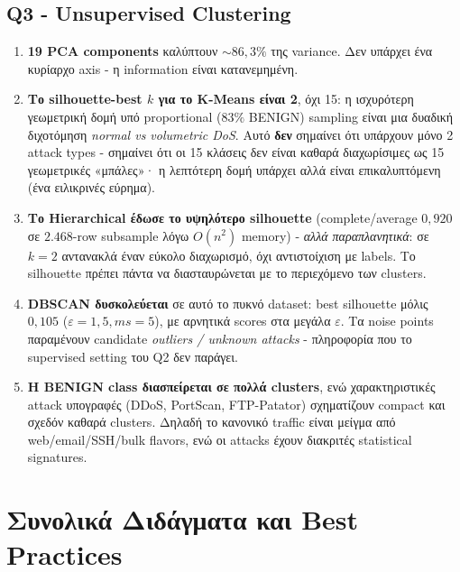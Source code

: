 \documentclass[12pt,a4paper,twoside]{book}
\begin{document}
\subsection{Q3 - Unsupervised Clustering}
\begin{enumerate}
    \item \textbf{19 PCA components} καλύπτουν \(\sim 86{,}3\%\) της variance.
    Δεν υπάρχει ένα κυρίαρχο axis - η information είναι κατανεμημένη.
    \item \textbf{Το silhouette-best \(k\) για το K-Means είναι 2}, όχι 15:
    η ισχυρότερη γεωμετρική δομή υπό proportional (\(83\%\) BENIGN)
    sampling είναι μια δυαδική διχοτόμηση \emph{normal vs volumetric DoS}.
    Αυτό \textbf{δεν} σημαίνει ότι υπάρχουν μόνο 2 attack types - σημαίνει
    ότι οι 15 κλάσεις δεν είναι καθαρά διαχωρίσιμες ως 15 γεωμετρικές
    «μπάλες»· η λεπτότερη δομή υπάρχει αλλά είναι επικαλυπτόμενη (ένα
    ειλικρινές εύρημα).
    \item \textbf{Το Hierarchical έδωσε το υψηλότερο silhouette}
    (complete/average \(0{,}920\) σε \(2.468\)-row subsample λόγω
    \(O(n^2)\) memory) - \emph{αλλά παραπλανητικά}: σε \(k=2\) αντανακλά
    έναν εύκολο διαχωρισμό, όχι αντιστοίχιση με labels. Το silhouette
    πρέπει πάντα να διασταυρώνεται με το περιεχόμενο των clusters.
    \item \textbf{DBSCAN δυσκολεύεται} σε αυτό το πυκνό dataset: best
    silhouette μόλις \(0{,}105\) (\(\varepsilon=1{,}5, ms=5\)), με
    αρνητικά scores στα μεγάλα \(\varepsilon\). Τα noise points
    παραμένουν candidate \emph{outliers / unknown attacks} - πληροφορία
    που το supervised setting του Q2 δεν παράγει.
    \item \textbf{Η BENIGN class διασπείρεται σε πολλά clusters}, ενώ
    χαρακτηριστικές attack υπογραφές (DDoS, PortScan, FTP-Patator)
    σχηματίζουν compact και σχεδόν καθαρά clusters. Δηλαδή το
    \og κανονικό\fg{} traffic είναι μείγμα από web/email/SSH/bulk
    flavors, ενώ οι attacks έχουν διακριτές statistical signatures.
\end{enumerate}

\section{Συνολικά Διδάγματα και Best Practices}
\end{document}
